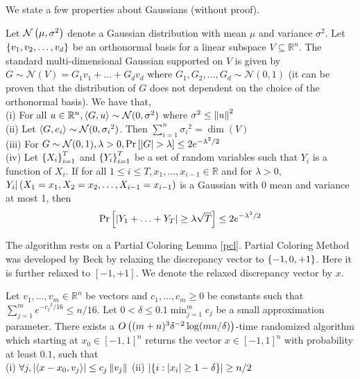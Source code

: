 We state a few properties about Gaussians (without proof).
\begin{Claim} \label{gaussian_properties}
Let $\mathcal{N}\left(\mu,{\sigma}^2 \right )$ denote a Gaussian distribution with mean $\mu$ and variance ${\sigma}^2$. Let $\left\{v_1,v_2,\hdots,v_d\right\}$ be an orthonormal basis for a linear subspace $V \subseteq \mathbb{R}^n$.
The standard multi-dimensional Gaussian supported on $V$ is given by $G \sim \mathcal{N}(V) = G_1v_1 + \hdots + G_dv_d$ where $G_1,G_2,\hdots,G_d \sim \mathcal{N}(0,1)$
(it can be proven that the distribution of $G$ does not dependent on the choice of the orthonormal basis).
We have that,\\
(i) For all $u \in \mathbb{R}^n, \left\langle G,u\right\rangle \sim \mathcal{N}(0,{\sigma}^2)$ where ${\sigma}^2 \leq \left\lVert u \right\rVert^2$\\
(ii) Let $\left\langle G,e_i\right\rangle \sim \mathcal{N}(0,{\sigma_i}^2)$.
Then $\sum_{i=1}^{n}{\sigma_i}^2 = \dim(V)$\\
(iii) For $G \sim \mathcal{N}(0,1), \lambda >0, \Pr\left[\left\lvert G \right\rvert>\lambda\right] \leq 2e^{-{\lambda}^2/2} $\\
(iv) Let $\left\{X_i\right\}_{i=1}^{T}$ and $\left\{Y_i\right\}_{i=1}^{T}$ be a set of random variables
such that $Y_i$ is a function of $X_i$.
If for all $1 \leq i \leq T,x_1,\hdots,x_{i-1}\in \mathbb{R}$ and for $\lambda > 0$,
$Y_i | \left(X_1 = x_1, X_2=x_2, \hdots, X_{i-1}=x_{i-1} \right )$
is a Gaussian with 0 mean and variance at most 1, then
\[ \Pr\left[\left\lvert Y_1 + \hdots + Y_T \right\rvert \geq \lambda\sqrt{T}\right] \leq 2e^{-{\lambda}^2/2} \]
\end{Claim}

The algorithm rests on a Partial Coloring Lemma \ref{pcl}. Partial Coloring Method was developed by Beck \cite{Beck1981} by relaxing the discrepancy vector to $\left\{-1,0,+1\right\}$. Here it is further relaxed to $\left[-1,+1\right]$.
We denote the relaxed discrepancy vector by $x$.

\begin{lemma} \label{pcl}
Let $v_1,\hdots,v_m \in \mathbb{R}^n$ be vectors and $c_1,\hdots,c_m \geq 0$ be constants such that
$\sum_{j=1}^{m}e^{{-c_j}^2/16} \leq n/16$.
Let $0 < \delta \le 0.1\min_{j=1}^m c_j$ be a small approximation parameter.
There exists a $O\left((m+n)^3{\delta}^{-2}\log(mn/\delta) \right )$-time randomized algorithm
which starting at $x_0 \in [-1,1]^n$ returns the vector $x \in [-1,1]^n$
with probability at least $0.1$, such that\\
\qquad (i) $\forall j, \left\lvert \left\langle x-x_0,v_j\right\rangle \right\rvert \leq c_j\left\lVert v_j \right\rVert$ \qquad \qquad \qquad \qquad
(ii) $\left\lvert \left\{i: \left\lvert x_i \right\rvert \geq 1- \delta\right\} \right\rvert \geq n/2$
\end{lemma}

